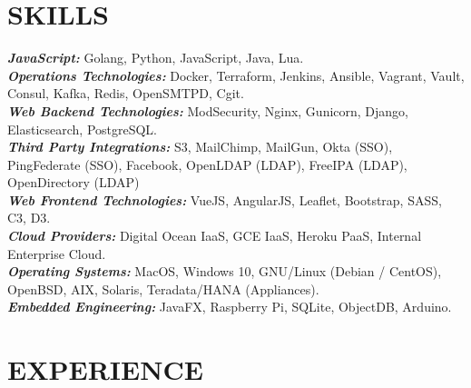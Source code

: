 \documentclass[margin, 10pt]{res} %
\begin{document}
\begin{resume}


\section{ SKILLS} 

{\sl \textbf{JavaScript:}} Golang, Python, JavaScript, Java, Lua. \\
{\sl \textbf{Operations Technologies:}} Docker, Terraform, Jenkins, Ansible, Vagrant, Vault, Consul, Kafka, Redis, OpenSMTPD, Cgit. \\
{\sl \textbf{Web Backend Technologies:}} ModSecurity, Nginx, Gunicorn, Django, Elasticsearch, PostgreSQL. \\
{\sl \textbf{Third Party Integrations:}} S3, MailChimp, MailGun, Okta (SSO), PingFederate (SSO), Facebook, OpenLDAP (LDAP), FreeIPA (LDAP), OpenDirectory (LDAP) \\
{\sl \textbf{Web Frontend Technologies:}} VueJS, AngularJS, Leaflet, Bootstrap, SASS, C3, D3. \\
{\sl \textbf{Cloud Providers:}} Digital Ocean IaaS, GCE IaaS, Heroku PaaS, Internal Enterprise Cloud. \\
{\sl \textbf{Operating Systems:}} MacOS, Windows 10, GNU/Linux (Debian / CentOS), OpenBSD, AIX, Solaris, Teradata/HANA (Appliances). \\
{\sl \textbf{Embedded Engineering:}} JavaFX, Raspberry Pi, SQLite, ObjectDB, Arduino. \\
 
 
\section{EXPERIENCE}


\end{resume}
\end{document}
